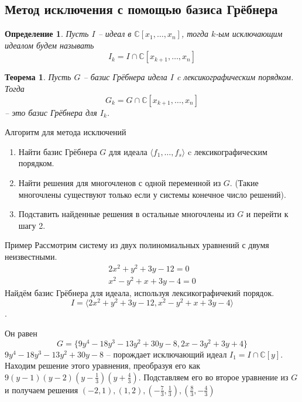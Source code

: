 \documentclass[notheorems,aspectratio=169]{beamer}
\newtheorem{theorem}{Теорема}
\newtheorem{definition}{Определение}
\begin{document}
\subsection{Метод исключения с помощью базиса Грёбнера}
\begin{frame}
    \begin{definition}
        Пусть $I$ -- идеал в $\mathbb{C}[x_1,\dots, x_n]$, тогда $k$-ым исключающим идеалом будем называть 
        $$
            I_k = I\cap\mathbb{C}[x_{k+1},\dots, x_n]
        $$
    \end{definition}
    
    \begin{theorem}
        Пусть $G$ -- базис Грёбнера идела $I$ c лексикографическим порядком. Тогда 
        $$
            G_k = G \cap \mathbb{C}[x_{k+1},\dots, x_n]
        $$
         -- это базис Грёбнера для $I_k$.
    \end{theorem}
\end{frame}

\begin{frame}{Алгоритм для метода исключений}
    \begin{enumerate}
        \item Найти базис Грёбнера $G$ для идеала $\langle f_1,\dots, f_s\rangle$ c лексикографическим порядком.
        \item Найти решения для многочленов с одной переменной из $G$. (Такие многочлены существуют только если у системы конечное число решений).
        \item Подставить найденные решения в остальные многочлены из $G$ и перейти к шагу 2.
    \end{enumerate}
    
\end{frame}

\begin{frame}{Пример}
    Рассмотрим систему из двух полиномиальных уравнений с двумя неизвестными.
   \begin{align*}
       2x^2+y^2+3y-12=0 \\
       x^2-y^2+x+3y-4=0
   \end{align*}
   Найдём базис Грёбнера для идеала, используя лексикографичекий порядок.
   $$I = \langle 2x^2+y^2+3y-12, x^2-y^2+x+3y-4\rangle$$.
   
   Он равен 
   $$G = \{9y^4-18y^3-13y^2+30y-8, 2x-3y^2+3y+4\}$$
    $9y^4-18y^3-13y^2+30y-8$ -- порождает исключающий идеал $I_1 = I\cap\mathbb{C}[y]$.
    Находим решение этого уравнения, преобразуя его как $9(y-1)(y-2)(y-\frac{1}{3})(y+\frac{4}{3})$. Подставляем его во второе уравнение из $G$ и получаем решения $(-2,1), (1,2), (-\frac{7}{3}, \frac{1}{3}), (\frac{8}{3}, -\frac{4}{3})$
\end{frame}
\end{document}
